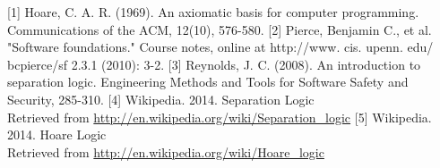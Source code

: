 
\begin{thebibliography}{}
    \bibitem{}
    	[1] Hoare, C. A. R. (1969). An axiomatic basis for computer programming. Communications of the ACM, 12(10), 576-580.
    	[2] Pierce, Benjamin C., et al. "Software foundations." Course notes, online at http://www. cis. upenn. edu/~ bcpierce/sf 2.3.1 (2010): 3-2.
    \bibitem{}
    	[3] Reynolds, J. C. (2008). An introduction to separation logic. Engineering Methods and Tools for Software Safety and Security, 285-310.
        [4] Wikipedia. 2014. Separation Logic\\ Retrieved from \url{http://en.wikipedia.org/wiki/Separation\_logic}
        [5] Wikipedia. 2014. Hoare Logic\\ Retrieved from \url{http://en.wikipedia.org/wiki/Hoare_logic}
\end{thebibliography}